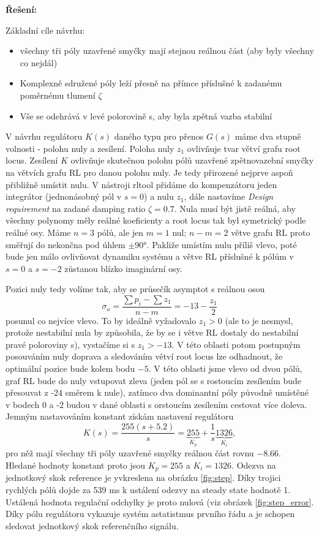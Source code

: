 \documentclass[twoside]{article}
\begin{document}
\textbf{Řešení:}

Základní cíle návrhu:
\begin{itemize}
	\item všechny tři póly uzavřené smyčky mají stejnou reálnou část (aby byly všechny co nejdál)
	\item Komplexně sdružené póly leží přesně na přímce příslušné k zadanému poměrnému tlumení $\zeta$
	\item Vše se odehrává v levé polorovině s, aby byla zpětná vazba stabilní
\end{itemize}

V návrhu regulátoru $K(s)$ daného typu pro přenos $G(s)$ máme dva stupně volnosti - polohu nuly a zesílení. Poloha nuly $z_1$ ovlivňuje tvar větví grafu root locus.
Zesílení $K$ ovlivňuje skutečnou polohu pólů uzavřené zpětnovazební smyčky na větvích grafu RL pro danou polohu nuly. Je tedy přirozené nejprve aspoň přibližně umístit nulu.
V nástroji rltool přidáme do kompenzátoru jeden integrátor (jednonásobný pól v $s= 0$) a nulu $z_1$, dále nastavíme \textit{Design requirement} na 
zadané damping ratio $\zeta = 0.7$. Nula musí být jistě reálná, aby všechny polynomy měly reálné koeficienty a root locus tak byl symetrický podle reálné osy.
Máme $n = 3$ pólů, ale jen $m = 1$ nul; $n-m = 2$ větve grafu RL proto směřují do nekončna pod úhlem $\pm 90°$. Pakliže umístím nulu příliš vlevo,
poté bude jen málo ovlivňovat dynamiku systému a větve RL příslušné k pólům v $s = 0$ a $s = -2$ zůstanou blízko imaginární osy.

Pozici nuly tedy volíme tak, aby se průsečík asymptot s reálnou osou
\begin{equation}
	\sigma_a = \frac{\sum p_i - \sum z_1}{n - m} = -13 -\frac{z_1}{2}
\end{equation}
posunul co nejvíce vlevo. To by ideálně vyžadovalo $z_1 > 0$ (ale to je nesmysl, protože nestabilní nula by způsobila, že by se i větve RL dostaly do nestabilní pravé poloroviny s),
vystačíme si s $z_1 > -13$. V této oblasti potom postupným posouváním nuly doprava a sledováním větví root locus lze odhadnout, že optimální pozice bude kolem bodu $-5$.
V této oblasti jsme vlevo od dvou pólů, graf RL bude do nuly vstupovat zleva (jeden pól se s rostoucím zesílením bude přesouvat z -24 směrem k nule),
zatímco dva dominantní póly původně umístěné v bodech 0 a -2 budou v dané oblasti s orstoucím zesílením cestovat více doleva.
Jemným nastavováním konstant získám nastavení regulátoru
\begin{equation}
	K(s) = \frac{255(s+5.2)}{s} = \underbrace{255}_{K_p} + \frac{1}{s} \underbrace{1326}_{K_i},
\end{equation}
pro něž mají všechny tři póly uzavřené smyčky reálnou část rovnu $-8.66$.
Hledané hodnoty konstant proto jsou $K_p = 255$ a $K_i = 1326$. Odezva na jednotkový skok reference je yvkreslena na obrázku \ref{fig:step}.
Díky trojici rychlých pólů dojde za 539 ms k ustálení odezvy na steady state hodnotě 1. Ustálená hodnota regulační odchylky je proto nulová (viz obrázek \ref{fig:step_error}. 
Díky pólu regulátoru vykazuje systém astatistmus prvního řádu a je schopen sledovat jednotkový skok referenčního signálu.
\end{document}

